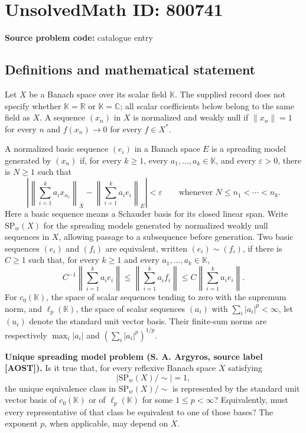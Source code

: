 \documentclass[11pt]{article}
\newcommand{\R}{\mathbb{R}}
\newcommand{\C}{\mathbb{C}}
\begin{document}
\section*{UnsolvedMath ID: 800741}
\textbf{Source problem code:} catalogue entry
\subsection{Definitions and mathematical statement}
Let \(X\) be a Banach space over its scalar field \(\mathbb K\). The supplied record does not specify whether \(\mathbb K=\R\) or \(\mathbb K=\C\); all scalar coefficients below belong to the same field as \(X\). A sequence \((x_n)\) in \(X\) is normalized and weakly null if \(\|x_n\|=1\) for every \(n\) and \(f(x_n)\to0\) for every \(f\in X^*\).

A normalized basic sequence \((e_i)\) in a Banach space \(E\) is a spreading model generated by \((x_n)\) if, for every \(k\geq1\), every \(a_1,\ldots,a_k\in\mathbb K\), and every \(\varepsilon>0\), there is \(N\geq1\) such that
\[
\left|\left\|\sum_{i=1}^k a_i x_{n_i}\right\|_X-\left\|\sum_{i=1}^k a_i e_i\right\|_E\right|<\varepsilon
\qquad\text{whenever }N\leq n_1<\cdots<n_k.
\]
Here a basic sequence means a Schauder basis for its closed linear span. Write \(\mathrm{SP}_w(X)\) for the spreading models generated by normalized weakly null sequences in \(X\), allowing passage to a subsequence before generation. Two basic sequences \((e_i)\) and \((f_i)\) are equivalent, written \((e_i)\sim(f_i)\), if there is \(C\geq1\) such that, for every \(k\geq1\) and every \(a_1,\ldots,a_k\in\mathbb K\),
\[
 C^{-1}\left\|\sum_{i=1}^k a_i e_i\right\|
 \leq \left\|\sum_{i=1}^k a_i f_i\right\|
 \leq C\left\|\sum_{i=1}^k a_i e_i\right\|.
\]
For \(c_0(\mathbb K)\), the space of scalar sequences tending to zero with the supremum norm, and \(\ell_p(\mathbb K)\), the space of scalar sequences \((a_i)\) with \(\sum_i|a_i|^p<\infty\), let \((u_i)\) denote the standard unit vector basis. Their finite-sum norms are respectively \(\max_i|a_i|\) and \((\sum_i|a_i|^p)^{1/p}\).

\textbf{Unique spreading model problem (S. A. Argyros, source label [AOST]).} Is it true that, for every reflexive Banach space \(X\) satisfying
\[
\bigl|\mathrm{SP}_w(X)/\!\sim\bigr|=1,
\]
the unique equivalence class in \(\mathrm{SP}_w(X)/\!\sim\) is represented by the standard unit vector basis of \(c_0(\mathbb K)\) or of \(\ell_p(\mathbb K)\) for some \(1\leq p<\infty\)? Equivalently, must every representative of that class be equivalent to one of those bases? The exponent \(p\), when applicable, may depend on \(X\).
\end{document}
